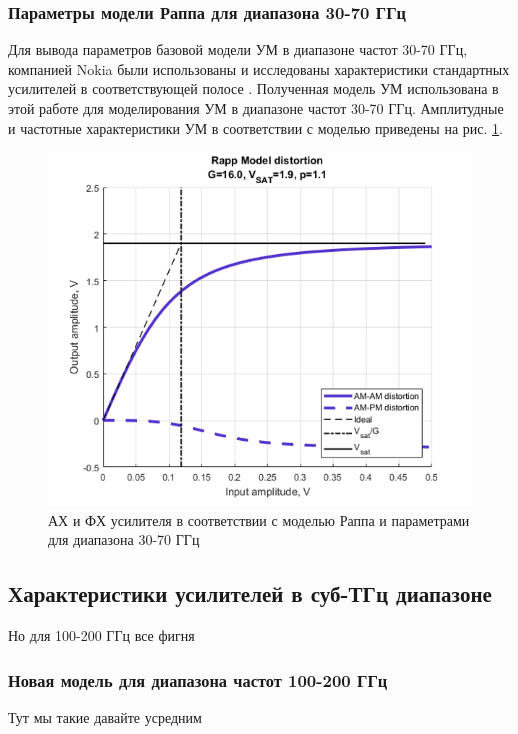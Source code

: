 \subsubsection{Параметры модели Раппа для диапазона 30-70 ГГц}
Для вывода параметров базовой модели УМ в диапазоне частот 30-70 ГГц,
компанией Nokia были использованы и исследованы характеристики стандартных
усилителей в соответствующей полосе \cite{nokia163314}. Полученная модель
УМ использована в этой работе для моделирования УМ в диапазоне частот 30-70
ГГц. Амплитудные и частотные характеристики УМ в соответствии с моделью
\cite{nokia163314} приведены на рис. \ref{fig:rapp_nokia}.

\begin{figure}[h!]
    \centering
    \includegraphics[width=0.7\linewidth]{figs/rapp_nokia.png}
    \caption{АХ и ФХ усилителя в соответствии с моделью Раппа и
    параметрами для диапазона 30-70 ГГц}
    \label{fig:rapp_nokia}
\end{figure}

\subsection{Характеристики усилителей в суб-ТГц диапазоне}
Но для 100-200 ГГц все фигня
\cite{zhang2021}\cite{amadorey2018}\cite{aliyun2022}

\subsubsection{Новая модель для диапазона частот 100-200 ГГц}
Тут мы такие давайте усредним


